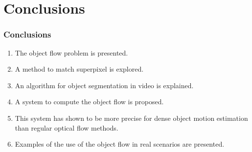 \documentclass{beamer}
\begin{document}
\section{Conclusions}

\begin{frame}
\frametitle{Conclusions}
\begin{enumerate}
\item The object flow problem is presented.
\item A method to match superpixel is explored.
\item An algorithm for object segmentation in video is explained.
\item A system to compute the object flow is proposed.
\item This system has shown to be more precise for dense object motion estimation than regular optical flow methods. 
\item Examples of the use of the 
object flow in real scenarios are presented.
\end{enumerate}

\end{frame}
\end{document}

